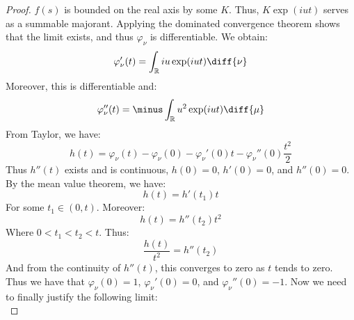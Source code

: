 \begin{proof}
                    $f(s)$ is bounded on the real axis by some $K$.
                    Thus, $K\exp(iut)$ serves as a summable majorant.
                    Applying the dominated convergence theorem shows
                    that the limit exists, and thus
                    $\varphi_{\nu}$ is differentiable. We obtain:
                    \begin{equation}
                        \varphi_{\nu}'(t)=
                        \int_{\mathbb{R}}iu\exp(iut)\diff{\nu}
                    \end{equation}
                    Moreover, this is differentiable and:
                    \begin{equation}
                        \varphi_{\nu}''(t)=
                        \minus\int_{\mathbb{R}}u^{2}\exp(iut)
                            \diff{\mu}
                    \end{equation}
                    From Taylor, we have:
                    \begin{equation}
                        h(t)=\varphi_{\nu}(t)-\varphi_{\nu}(0)
                            -\varphi_{\nu}'(0)t-\varphi_{\nu}''(0)
                                \frac{t^{2}}{2}
                    \end{equation}
                    Thus $h''(t)$ exists and is continuous,
                    $h(0)=0$, $h'(0)=0$, and $h''(0)=0$. By the
                    mean value theorem, we have:
                    \begin{equation}
                        h(t)=h'(t_{1})t
                    \end{equation}
                    For some $t_{1}\in(0,t)$. Moreover:
                    \begin{equation}
                        h(t)=h''(t_{2})t^{2}
                    \end{equation}
                    Where $0<t_{1}<t_{2}<t$. Thus:
                    \begin{equation}
                        \frac{h(t)}{t^{2}}=h''(t_{2})
                    \end{equation}
                    And from the continuity of $h''(t)$, this
                    converges to zero as $t$ tends to zero. Thus
                    we have that $\varphi_{\nu}(0)=1$,
                    $\varphi_{\nu}'(0)=0$, and
                    $\varphi_{\nu}''(0)=\minus{1}$. Now we need to 
                    finally justify the following limit:
                    \begin{equation}

\end{equation}
\end{proof}
